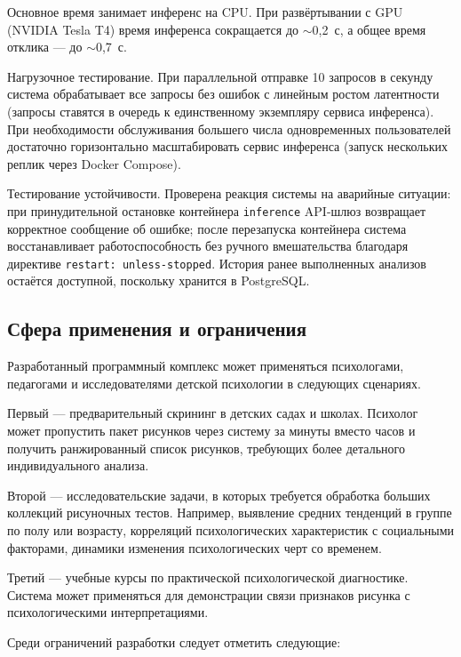 Основное время занимает инференс на CPU. При развёртывании с GPU (NVIDIA Tesla T4) время инференса сокращается до $\sim$0,2~с, а общее время отклика --- до $\sim$0,7~с.

Нагрузочное тестирование. При параллельной отправке 10 запросов в секунду система обрабатывает все запросы без ошибок с линейным ростом латентности (запросы ставятся в очередь к единственному экземпляру сервиса инференса). При необходимости обслуживания большего числа одновременных пользователей достаточно горизонтально масштабировать сервис инференса (запуск нескольких реплик через Docker Compose).

Тестирование устойчивости. Проверена реакция системы на аварийные ситуации: при принудительной остановке контейнера \texttt{inference} API-шлюз возвращает корректное сообщение об ошибке; после перезапуска контейнера система восстанавливает работоспособность без ручного вмешательства благодаря директиве \texttt{restart: unless-stopped}. История ранее выполненных анализов остаётся доступной, поскольку хранится в PostgreSQL.

\subsection{Сфера применения и ограничения}

Разработанный программный комплекс может применяться психологами, педагогами и исследователями детской психологии в следующих сценариях.

Первый --- предварительный скрининг в детских садах и школах. Психолог может пропустить пакет рисунков через систему за минуты вместо часов и получить ранжированный список рисунков, требующих более детального индивидуального анализа.

Второй --- исследовательские задачи, в которых требуется обработка больших коллекций рисуночных тестов. Например, выявление средних тенденций в группе по полу или возрасту, корреляций психологических характеристик с социальными факторами, динамики изменения психологических черт со временем.

Третий --- учебные курсы по практической психологической диагностике. Система может применяться для демонстрации связи признаков рисунка с психологическими интерпретациями.

Среди ограничений разработки следует отметить следующие:


